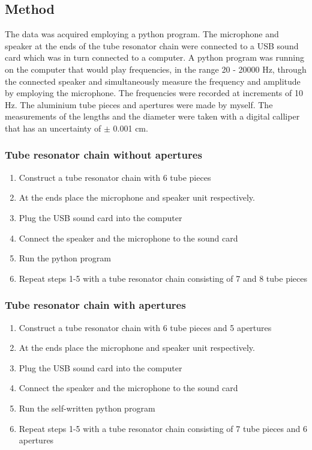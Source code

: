 \documentclass[12pt]{article}
\begin{document}
\subsection{Method}
The data was acquired employing a python program. The microphone and speaker at the ends of the tube resonator chain were connected to a USB sound card which was in turn connected to a computer. A python program was running on the computer that would play frequencies, in the range 20 - 20000 Hz, through the connected speaker and simultaneously measure the frequency and amplitude by employing the microphone. The frequencies were recorded at increments of 10 Hz. The aluminium tube pieces and apertures were made by myself. The measurements of the lengths and the diameter were taken with a digital calliper that has an uncertainty of $\pm$ 0.001 cm. 
\subsubsection{Tube resonator chain without apertures}
\begin{enumerate}
	\item Construct a tube resonator chain with 6 tube pieces
	\item At the ends place the microphone and speaker unit respectively.
	\item Plug the USB sound card into the computer
	\item Connect the speaker and the microphone to the sound card
	\item Run the python program
	\item Repeat steps 1-5 with a tube resonator chain consisting of 7 and 8 tube pieces
\end{enumerate}
\subsubsection{Tube resonator chain with apertures}
\begin{enumerate}
	\item Construct a tube resonator chain with 6 tube pieces and 5 apertures 
	\item At the ends place the microphone and speaker unit respectively.
	\item Plug the USB sound card into the computer
	\item Connect the speaker and the microphone to the sound card
	\item Run the self-written python program
	\item Repeat steps 1-5 with a tube resonator chain consisting of 7 tube pieces and 6 apertures
\end{enumerate}
\end{document}
